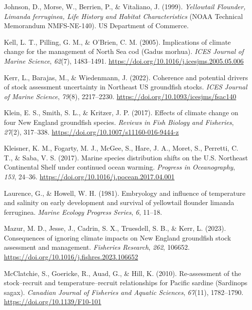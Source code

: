 \documentclass[
  12pt,
]{article}
\newlength{\cslhangindent}
\newenvironment{CSLReferences}[2] %
 {\begin{list}{}{%
  \setlength{\itemindent}{0pt}
  \setlength{\leftmargin}{0pt}
  \setlength{\parsep}{0pt}
  \ifodd #1
   \setlength{\leftmargin}{\cslhangindent}
   \setlength{\itemindent}{-1\cslhangindent}
  \fi
  \setlength{\itemsep}{#2\baselineskip}}}
 {\end{list}}
\begin{document}
\begin{CSLReferences}{1}{2}
Johnson, D., Morse, W., Berrien, P., \& Vitaliano, J. (1999). \emph{Yellowtail {Flounder}, {Limanda} ferruginea, {Life History} and {Habitat Characteristics}} (NOAA Technical Memorandum NMFS-NE-140). US Department of Commerce.

Kell, L. T., Pilling, G. M., \& O'Brien, C. M. (2005). Implications of climate change for the management of {North Sea} cod ({Gadus} morhua). \emph{ICES Journal of Marine Science}, \emph{62}(7), 1483--1491. \url{https://doi.org/10.1016/j.icesjms.2005.05.006}

Kerr, L., Barajas, M., \& Wiedenmann, J. (2022). Coherence and potential drivers of stock assessment uncertainty in Northeast US groundfish stocks. \emph{ICES Journal of Marine Science}, \emph{79}(8), 2217--2230. \url{https://doi.org/10.1093/icesjms/fsac140}

Klein, E. S., Smith, S. L., \& Kritzer, J. P. (2017). Effects of climate change on four New England groundfish species. \emph{Reviews in Fish Biology and Fisheries}, \emph{27}(2), 317--338. \url{https://doi.org/10.1007/s11160-016-9444-z}

Kleisner, K. M., Fogarty, M. J., McGee, S., Hare, J. A., Moret, S., Perretti, C. T., \& Saba, V. S. (2017). Marine species distribution shifts on the U.S. Northeast Continental Shelf under continued ocean warming. \emph{Progress in Oceanography}, \emph{153}, 24--36. \url{https://doi.org/10.1016/j.pocean.2017.04.001}

Laurence, G., \& Howell, W. H. (1981). Embryology and influence of temperature and salinity on early development and survival of yellowtail flounder limanda ferruginea. \emph{Marine Ecology Progress Series}, \emph{6}, 11--18.

Mazur, M. D., Jesse, J., Cadrin, S. X., Truesdell, S. B., \& Kerr, L. (2023). Consequences of ignoring climate impacts on New England groundfish stock assessment and management. \emph{Fisheries Research}, \emph{262}, 106652. \url{https://doi.org/10.1016/j.fishres.2023.106652}

McClatchie, S., Goericke, R., Auad, G., \& Hill, K. (2010). Re-assessment of the stock--recruit and temperature--recruit relationships for {Pacific} sardine ({Sardinops} sagax). \emph{Canadian Journal of Fisheries and Aquatic Sciences}, \emph{67}(11), 1782--1790. \url{https://doi.org/10.1139/F10-101}


\end{CSLReferences}
\end{document}
